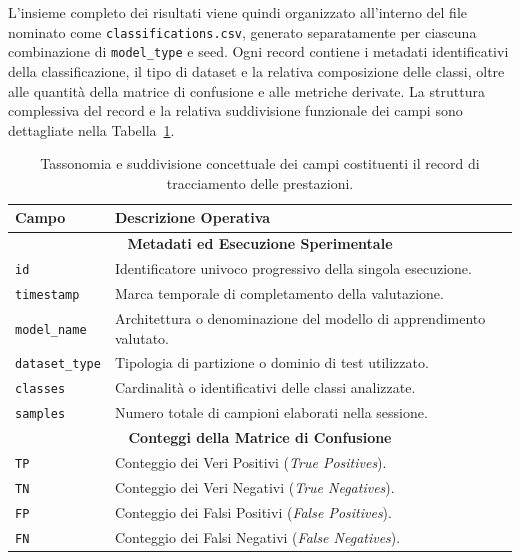 L'insieme completo dei risultati viene quindi organizzato all'interno del file nominato come \newline \texttt{classifications.csv}, generato separatamente per ciascuna combinazione di \texttt{model\_type} e seed. 
Ogni record contiene i metadati identificativi della classificazione, il tipo di dataset e la relativa composizione delle classi, oltre alle quantità della matrice di confusione e alle metriche derivate. 
La struttura complessiva del record e la relativa suddivisione funzionale dei campi sono dettagliate nella Tabella~\ref{tab:record_structure}.

\begin{table}[H]
    \centering
    \small
    \caption{Tassonomia e suddivisione concettuale dei campi costituenti il record di tracciamento delle prestazioni.}
    \label{tab:record_structure}
    \begin{tabularx}{\textwidth}{l >{\raggedright\arraybackslash}X}
        \toprule
        \textbf{Campo} & \textbf{Descrizione Operativa} \\
        \midrule
        \multicolumn{2}{c}{\textbf{Metadati ed Esecuzione Sperimentale}} \\
        \hline
        \texttt{id} & Identificatore univoco progressivo della singola esecuzione. \\
        \texttt{timestamp} & Marca temporale di completamento della valutazione. \\
        \texttt{model\_name} & Architettura o denominazione del modello di apprendimento valutato. \\
        \texttt{dataset\_type} & Tipologia di partizione o dominio di test utilizzato. \\
        \texttt{classes} & Cardinalità o identificativi delle classi analizzate. \\
        \texttt{samples} & Numero totale di campioni elaborati nella sessione. \\
        \hline
        \multicolumn{2}{c}{\textbf{Conteggi della Matrice di Confusione}} \\
        \hline
        \texttt{TP} & Conteggio dei Veri Positivi (\textit{True Positives}). \\
        \texttt{TN} & Conteggio dei Veri Negativi (\textit{True Negatives}). \\
        \texttt{FP} & Conteggio dei Falsi Positivi (\textit{False Positives}). \\
        \texttt{FN} & Conteggio dei Falsi Negativi (\textit{False Negatives}). \\

\end{tabularx}
\end{table}
